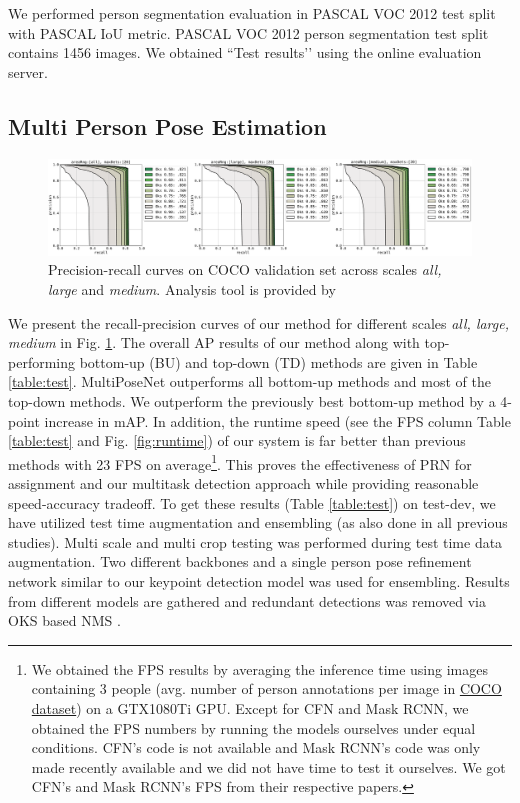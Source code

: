 \documentclass[runningheads]{llncs}
\begin{document}
We performed person segmentation evaluation in PASCAL VOC 2012 test split with PASCAL IoU metric. PASCAL VOC 2012 person segmentation test split contains 1456 images. We obtained ``Test results’’ using the online evaluation server.
\subsection{Multi Person Pose Estimation}
\begin{figure}
\centering
\includegraphics[width=\textwidth]{Figures/analyze.pdf}
\caption{Precision-recall curves on COCO validation set across scales \textit{all, large} and \textit{medium}. Analysis tool is provided by \cite{Ronchi2017}}
\label{fig:analyze}
\end{figure} 


We present the recall-precision curves of our method for different scales \textit{all, large, medium} in Fig. \ref{fig:analyze}. The overall AP results of our method along with top-performing bottom-up (BU) and top-down (TD) methods are given in  Table \ref{table:test}.  MultiPoseNet outperforms all bottom-up methods and most of the top-down methods. We outperform the previously best bottom-up method\cite{Newell2016b} by a 4-point increase in mAP. In addition, the runtime speed (see the FPS column Table \ref{table:test} and Fig. \ref{fig:runtime}) of our system is far better than previous methods with 23 FPS on average\footnote{We obtained the FPS results by averaging the inference time using images containing 3 people (avg. number of person annotations per image in \href{http://image-net.org/challenges/talks/2016/ECCV2016_workshop_presentation_keypoint.pdf}{COCO dataset}) on a GTX1080Ti GPU. Except for CFN and Mask RCNN, we obtained the FPS numbers by running the models ourselves under equal conditions. CFN’s code is not available and Mask RCNN’s code was only made recently available and we did not have time to test it ourselves. We got CFN’s and Mask RCNN’s FPS from their respective papers.}. This proves the effectiveness of PRN for assignment and our multitask detection approach while providing reasonable speed-accuracy tradeoff. To get these results (Table \ref{table:test}) on test-dev, we have utilized test time augmentation and ensembling (as also done in all previous studies). Multi scale and multi crop testing was performed during test time data augmentation. Two different backbones and a single person pose refinement network similar to our keypoint detection model was used for ensembling. Results from different models are gathered and redundant detections was removed via OKS based NMS \cite{Papandreou2017}. 
\end{document}
